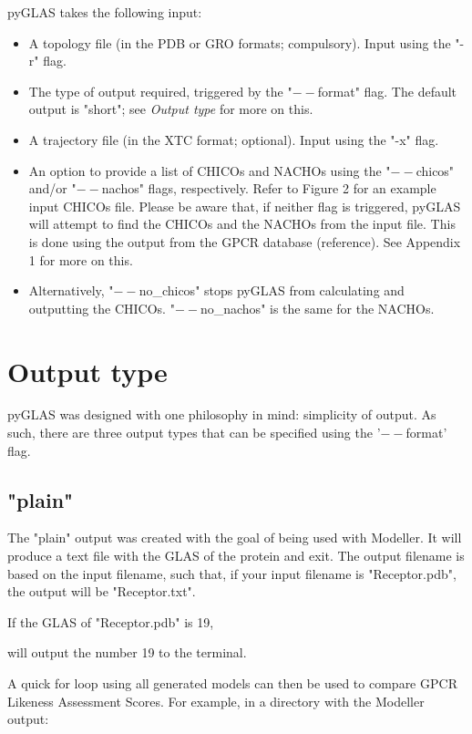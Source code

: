 \documentclass[12pt]{article}
\begin{document}
pyGLAS takes the following input:

\begin{itemize}
	\item A topology file (in the PDB or GRO formats; compulsory). Input using the "-r" flag.
	\item The type of output required, triggered by the "$--$format" flag. The default output is "short"; see \emph{Output type} for more on this.
	\item A trajectory file (in the XTC format; optional). Input using the "-x" flag.
	\item An option to provide a list of CHICOs and NACHOs using the "$--$chicos" and/or "$--$nachos" flags, respectively. Refer to Figure 2 for an example input CHICOs file. Please be aware that, if neither flag is triggered, pyGLAS will attempt to find the CHICOs and the NACHOs from the input file. This is done using the output from the GPCR database (reference). See Appendix 1 for more on this.
	\item Alternatively, "$--$no\_chicos"  stops pyGLAS from calculating and outputting the CHICOs. "$--$no\_nachos" is the same for the NACHOs.
\end{itemize}

\section{Output type}
pyGLAS was designed with one philosophy in mind: simplicity of output. As such, there are three output types that can be specified using the '$--$format' flag.

\subsection{"plain"}
The "plain" output was created with the goal of being used with Modeller. It will produce a text file with the GLAS of the protein and exit. The output filename is based on the input filename, such that, if your input filename is "Receptor.pdb", the output will be "Receptor.txt".

If the GLAS of "Receptor.pdb" is 19, 


will output the number 19 to the terminal.

A quick for loop using all generated models can then be used to compare GPCR Likeness Assessment Scores. For example, in a directory with the Modeller output:
\end{document}
